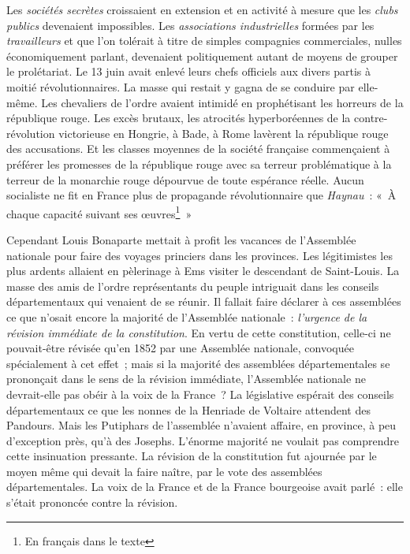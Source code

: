 \documentclass[french,twoside]{book} %
\begin{document}
Les \emph{sociétés secrètes} croissaient en extension et en activité à mesure que les \emph{clubs publics} devenaient impossibles. Les \emph{associations industrielles} formées par les \emph{travailleurs} et que l’on tolérait à titre de simples compagnies commerciales, nulles économiquement parlant, devenaient politiquement autant de moyens de grouper le prolétariat. Le 13 juin avait enlevé leurs chefs officiels aux divers partis à moitié révolutionnaires. La masse qui restait y gagna de se conduire par elle-même. Les chevaliers de l’ordre avaient intimidé en prophétisant les horreurs de la république rouge. Les excès brutaux, les atrocités hyperboréennes de la contre-révolution victorieuse en Hongrie, à Bade, à Rome lavèrent la république rouge des accusations. Et les classes moyennes de la société française commençaient à préférer les promesses de la république rouge avec sa terreur problématique à la terreur de la monarchie rouge dépourvue de toute espérance réelle. Aucun socialiste ne fit en France plus de propagande révolutionnaire que \emph{Haynau} : « À chaque capacité suivant ses œuvres\footnote{En français dans le texte} »\par
Cependant Louis Bonaparte mettait à profit les vacances de l’Assemblée nationale pour faire des voyages princiers dans les provinces. Les légitimistes les plus ardents allaient en pèlerinage à Ems visiter le descendant de Saint-Louis. La masse des amis de l’ordre représentants du peuple intriguait dans les conseils départementaux qui venaient de se réunir. Il fallait faire déclarer à ces assemblées ce que n’osait encore la majorité de l’Assemblée nationale : \emph{l’urgence de la révision immédiate de la constitution}. En vertu de cette constitution, celle-ci ne pouvait-être révisée qu’en 1852 par une Assemblée nationale, convoquée spécialement à cet effet ; mais si la majorité des assemblées départementales se prononçait dans le sens de la révision immédiate, l’Assemblée nationale ne devrait-elle pas obéir à la voix de la France ? La législative espérait des conseils départementaux ce que les nonnes de la Henriade de Voltaire attendent des Pandours. Mais les Putiphars de l’assemblée n’avaient affaire, en province, à peu d’exception près, qu’à des Josephs. L’énorme majorité ne voulait pas comprendre cette insinuation pressante. La révision de la constitution fut ajournée par le moyen même qui devait la faire naître, par le vote des assemblées départementales. La voix de la France et de la France bourgeoise avait parlé : elle s’était prononcée contre la révision.\par
\end{document}
